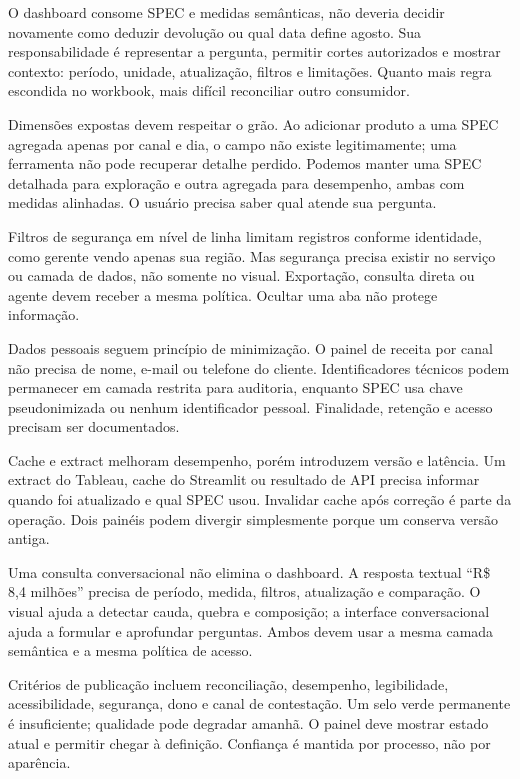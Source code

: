 O dashboard consome SPEC e medidas semânticas, não deveria decidir novamente como deduzir devolução ou qual data define agosto. Sua responsabilidade é representar a pergunta, permitir cortes autorizados e mostrar contexto: período, unidade, atualização, filtros e limitações. Quanto mais regra escondida no workbook, mais difícil reconciliar outro consumidor.

Dimensões expostas devem respeitar o grão. Ao adicionar produto a uma SPEC agregada apenas por canal e dia, o campo não existe legitimamente; uma ferramenta não pode recuperar detalhe perdido. Podemos manter uma SPEC detalhada para exploração e outra agregada para desempenho, ambas com medidas alinhadas. O usuário precisa saber qual atende sua pergunta.

Filtros de segurança em nível de linha limitam registros conforme identidade, como gerente vendo apenas sua região. Mas segurança precisa existir no serviço ou camada de dados, não somente no visual. Exportação, consulta direta ou agente devem receber a mesma política. Ocultar uma aba não protege informação.

Dados pessoais seguem princípio de minimização. O painel de receita por canal não precisa de nome, e-mail ou telefone do cliente. Identificadores técnicos podem permanecer em camada restrita para auditoria, enquanto SPEC usa chave pseudonimizada ou nenhum identificador pessoal. Finalidade, retenção e acesso precisam ser documentados.

Cache e extract melhoram desempenho, porém introduzem versão e latência. Um extract do Tableau, cache do Streamlit ou resultado de API precisa informar quando foi atualizado e qual SPEC usou. Invalidar cache após correção é parte da operação. Dois painéis podem divergir simplesmente porque um conserva versão antiga.

Uma consulta conversacional não elimina o dashboard. A resposta textual ``R\$ 8,4 milhões'' precisa de período, medida, filtros, atualização e comparação. O visual ajuda a detectar cauda, quebra e composição; a interface conversacional ajuda a formular e aprofundar perguntas. Ambos devem usar a mesma camada semântica e a mesma política de acesso.

Critérios de publicação incluem reconciliação, desempenho, legibilidade, acessibilidade, segurança, dono e canal de contestação. Um selo verde permanente é insuficiente; qualidade pode degradar amanhã. O painel deve mostrar estado atual e permitir chegar à definição. Confiança é mantida por processo, não por aparência.

